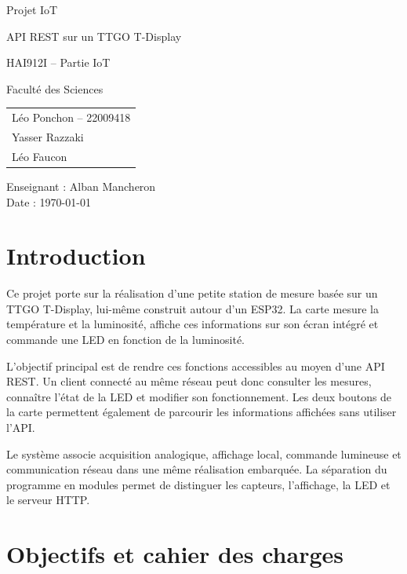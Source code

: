 \documentclass[12pt,a4paper]{report}
\begin{document}
\begin{titlepage}
  \centering
  \vspace*{2cm}

  {\Huge Projet IoT\par}
  \vspace{0.5cm}
  {\LARGE API REST sur un TTGO T-Display\par}
  \vspace{1.5cm}

  {\Large HAI912I -- Partie IoT\par}
  \vspace{0.5cm}
  {\large Faculté des Sciences\par}
  \vfill

  \begin{tabular}{l}
    Léo Ponchon -- 22009418 \\
    Yasser Razzaki \\
    Léo Faucon
  \end{tabular}

  \vspace{1cm}

  Enseignant : Alban Mancheron\\
  Date : \today
\end{titlepage}

\tableofcontents
\newpage

\section{Introduction}

Ce projet porte sur la réalisation d'une petite station de mesure basée sur un
TTGO T-Display, lui-même construit autour d'un ESP32. La carte mesure la
température et la luminosité, affiche ces informations sur son écran intégré et
commande une LED en fonction de la luminosité.

L'objectif principal est de rendre ces fonctions accessibles au moyen d'une
API REST. Un client connecté au même réseau peut donc consulter les mesures,
connaître l'état de la LED et modifier son fonctionnement. Les deux boutons de
la carte permettent également de parcourir les informations affichées sans
utiliser l'API.

Le système associe acquisition analogique, affichage local, commande lumineuse
et communication réseau dans une même réalisation embarquée. La séparation du
programme en modules permet de distinguer les capteurs, l'affichage, la LED et
le serveur HTTP.

\section{Objectifs et cahier des charges}
\end{document}
